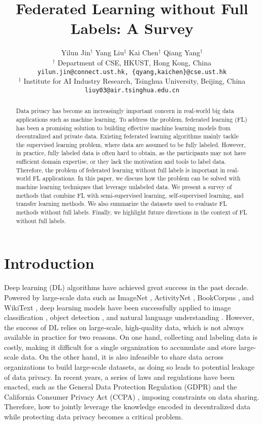 \documentclass[11pt]{article}
\title{Federated Learning without Full Labels: A Survey}
\author{Yilun Jin$^{\dagger}$
\hspace{2em} Yang Liu$^{\ddagger}$ 
\hspace{2em} Kai Chen$^{\dagger}$ 
\hspace{2em} Qiang Yang$^\dagger$ \\
$^{\dagger}$ Department of CSE, HKUST, Hong Kong, China \\
\texttt{\small yilun.jin@connect.ust.hk, \{qyang,kaichen\}@cse.ust.hk}\\
$^{\ddagger}$ Institute for AI Industry Research, Tsinghua University, Beijing, China \\ \texttt{\small liuy03@air.tsinghua.edu.cn}}
\begin{document}
\maketitle
\begin{abstract}
Data privacy has become an increasingly important concern in real-world big data applications such as machine learning. To address the problem, federated learning (FL) has been a promising solution to building effective machine learning models from decentralized and private data. Existing federated learning algorithms mainly tackle the supervised learning problem, where data are assumed to be fully labeled. However, in practice, fully labeled data is often hard to obtain, as the participants may not have sufficient domain expertise, or they lack the motivation and tools to label data. Therefore, the problem of federated learning without full labels is important in real-world FL applications. In this paper, we discuss how the problem can be solved with machine learning techniques that leverage unlabeled data. We present a survey of methods that combine FL with semi-supervised learning, self-supervised learning, and transfer learning methods. We also summarize the datasets used to evaluate FL methods without full labels. Finally, we highlight future directions in the context of FL without full labels. 
\end{abstract}

\section{Introduction}
Deep learning (DL) algorithms have achieved great success in the past decade. Powered by large-scale data such as ImageNet \cite{deng2009imagenet}, ActivityNet \cite{heilbron2015activitynet}, BookCorpus \cite{zhu2015aligning}, and WikiText \cite{merity2017pointer}, deep learning models have been successfully applied to image classification \cite{he2016deep}, object detection \cite{he2017mask}, and natural language understanding \cite{devlin2019bert}. However, the success of DL relies on large-scale, high-quality data, which is not always available in practice for two reasons. On one hand, collecting and labeling data is costly, making it difficult for a single organization to accumulate and store large-scale data. On the other hand, it is also infeasible to share data across organizations to build large-scale datasets, as doing so leads to potential leakage of data privacy. In recent years, a series of laws and regulations have been enacted, such as the General Data Protection Regulation (GDPR) \cite{gdpr} and the California Consumer Privacy Act (CCPA) \cite{ccpa}, imposing constraints on data sharing. Therefore, how to jointly leverage the knowledge encoded in decentralized data while protecting data privacy becomes a critical problem. 
\end{document}
